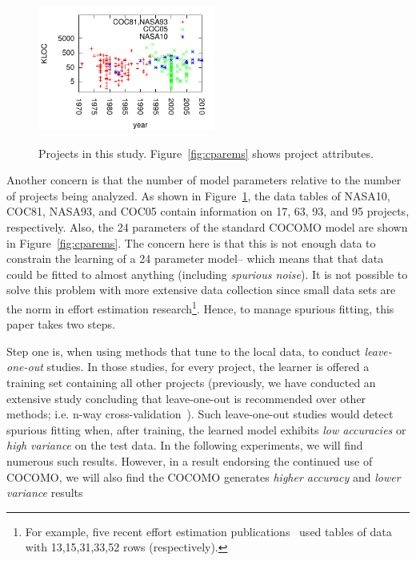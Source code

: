 \documentclass{sig-alternate}
\newcommand{\fig}[1]{Figure~\ref{fig:#1}}
\begin{document}
\begin{figure}[!t]
\begin{center}
~\\~\\

\includegraphics[width=2.3in]{yearLOC.pdf}
\noindent
\end{center}
\caption{Projects in this study. \fig{cparems}
shows project attributes.}\label{fig:types}
\end{figure}



Another concern  is that the number of model parameters
relative to the number of projects being analyzed.
As shown in \fig{types}, the data tables of NASA10, COC81, NASA93, and COC05
contain information on 17, 63, 93, and 95  projects, respectively. Also,
the 24 parameters of the standard COCOMO model are shown in \fig{cparems}.
The concern here is that  this is not enough data to constrain the learning of a 24 parameter
model-- which means that that data could be fitted to almost anything (including {\em spurious noise}).
It is not possible to solve this problem
with more extensive data collection since small data sets are the norm in effort estimation research\footnote{
For example, five recent  effort estimation
publications~\cite{Mendes2003,Auer2006,baker07,koc11a,Li2009} used tables of data with
13,15,31,33,52 rows (respectively).}.
Hence, to manage spurious fitting, this paper takes two steps.

Step one is, when using methods that tune to the local data, to conduct {\em leave-one-out} studies.
In those studies, for every project, the learner is offered a training
set containing all other projects (previously, we have conducted an extensive study
concluding that 
leave-one-out is recommended over  other methods; i.e. n-way cross-validation~\cite{koc13a}).
Such leave-one-out studies  would detect spurious fitting when, after training, the learned model
exhibits {\em low accuracies} or {\em high variance} on the test data.  In the following experiments,
we will find numerous such results. However, in a result endorsing the continued use of COCOMO,
we will also find the COCOMO generates
{\em higher accuracy} and {\em lower variance} results
\end{document}
